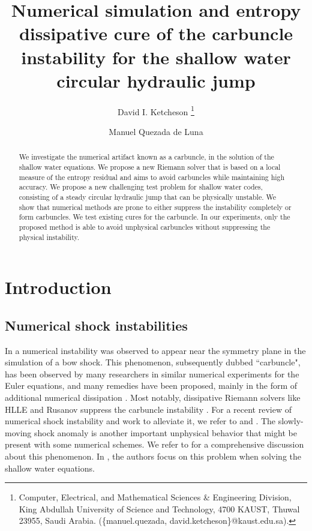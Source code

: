 \documentclass[preprint, 11pt]{article}
\title{Numerical simulation and entropy dissipative cure of the
  carbuncle instability for the shallow water circular hydraulic jump}
\author{
    David I. Ketcheson
  \thanks{
    Computer, Electrical, and Mathematical Sciences \& Engineering Division,
    King Abdullah University of Science and Technology, 4700 KAUST, Thuwal
    23955, Saudi Arabia. (\{manuel.quezada, david.ketcheson\}@kaust.edu.sa).
  }
    \and
    Manuel Quezada de Luna
  \footnotemark[1]
}
\begin{document}
\maketitle

\begin{abstract}
We investigate the numerical artifact known as a carbuncle, in the solution
of the shallow water equations.  We propose a new Riemann solver that is based
on a local measure of the entropy residual and aims to avoid carbuncles while
maintaining high accuracy.
We propose a new challenging test problem for shallow water codes, 
consisting of a steady circular hydraulic
jump that can be physically unstable.  We show that numerical methods are prone to
either suppress the instability completely or form carbuncles.
We test existing cures for the carbuncle. In our experiments, only the proposed
method is able to avoid unphysical carbuncles without suppressing the
physical instability.
\end{abstract}



\section{Introduction}

\subsection{Numerical shock instabilities}

In \cite{peery1988blunt} a numerical instability was observed to
appear near the symmetry plane in the simulation of a bow shock.
This phenomenon, subsequently dubbed ``carbuncle", has been observed by many researchers
in similar numerical experiments for the Euler equations, and many remedies
have been proposed, mainly in the form of additional numerical dissipation
\cite{quirk1997contribution,pandolfi2001numerical,dumbser2004matrix,chauvat2005shock,ismail2009proposed,shen2014stability}.
Most notably, dissipative Riemann solvers like HLLE and Rusanov suppress the carbuncle instability \cite{quirk1997contribution}.
For a recent review of numerical shock instability and work to alleviate it,
we refer to \cite[Section 2.5]{simonnumerical} and \cite{zaide2012numerical}.
The slowly-moving shock anomaly is another important unphysical behavior that might be present 
with some numerical schemes. We refer to \cite{zaide2012numerical} for a comprehensive 
discussion about this phenomenon.
In \cite{navas2019improved}, the authors focus on this problem when solving the shallow water equations.
\end{document}
